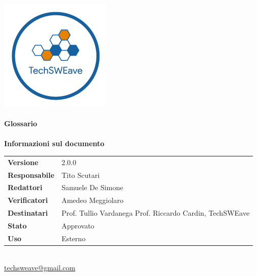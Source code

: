 \documentclass[a4paper]{article}
\begin{document}
\begin{titlepage}
    \begin{center}
        \includegraphics{../../../Images/logo}\\
        \vspace{20px}
        \textcolor{logo}{\hrulefill}\\
        \vspace{20px}
        \textbf{\huge\textcolor{logo}{Glossario}}\\
        \vspace{10px}
        \textcolor{logo}{\hrulefill}\\
        \vspace{40px}
        \textbf{\Large Informazioni sul documento}\\
        \vspace{20px}
        \begin{tabular}{p{100px} | p{100px}}
            \textbf{Versione}     & 2.0.0                                                                      \\
            \textbf{Responsabile} & Tito Scutari                                                               \\
            \textbf{Redattori}    & Samuele De Simone                                                          \\
            \textbf{Verificatori} & Amedeo Meggiolaro                                                          \\
            \textbf{Destinatari}  & Prof. Tullio Vardanega \newline Prof. Riccardo Cardin, \newline TechSWEave \\
            \textbf{Stato}        & Approvato                                                                  \\
            \textbf{Uso}          & Esterno                                                                    \\
        \end{tabular}\\
        \vspace{60px}
        \href{mailto:techsweave@gmail.com}{techsweave@gmail.com}\\

    \end{center}
\end{titlepage}
\end{document}
